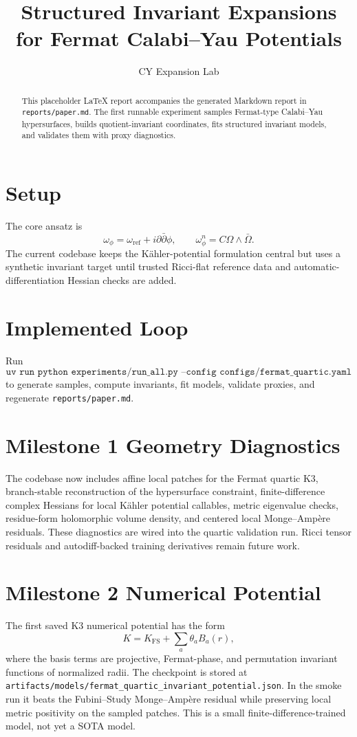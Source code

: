 \documentclass{article}
\title{Structured Invariant Expansions for Fermat Calabi--Yau Potentials}
\author{CY Expansion Lab}
\date{}
\begin{document}
\maketitle

\begin{abstract}
This placeholder \LaTeX{} report accompanies the generated Markdown report in \texttt{reports/paper.md}. The first runnable experiment samples Fermat-type Calabi--Yau hypersurfaces, builds quotient-invariant coordinates, fits structured invariant models, and validates them with proxy diagnostics.
\end{abstract}

\section{Setup}
The core ansatz is
\[
\omega_\phi = \omega_{\mathrm{ref}} + i\partial\bar\partial\phi,
\qquad \omega_\phi^n = C\Omega\wedge\bar\Omega.
\]
The current codebase keeps the Kähler-potential formulation central but uses a synthetic invariant target until trusted Ricci-flat reference data and automatic-differentiation Hessian checks are added.

\section{Implemented Loop}
Run
\[
\texttt{uv run python experiments/run\_all.py --config configs/fermat\_quartic.yaml}
\]
to generate samples, compute invariants, fit models, validate proxies, and regenerate \texttt{reports/paper.md}.

\section{Milestone 1 Geometry Diagnostics}
The codebase now includes affine local patches for the Fermat quartic K3, branch-stable reconstruction of the hypersurface constraint, finite-difference complex Hessians for local Kähler potential callables, metric eigenvalue checks, residue-form holomorphic volume density, and centered local Monge--Ampère residuals. These diagnostics are wired into the quartic validation run. Ricci tensor residuals and autodiff-backed training derivatives remain future work.

\section{Milestone 2 Numerical Potential}
The first saved K3 numerical potential has the form
\[
K = K_{\mathrm{FS}} + \sum_a \theta_a B_a(r),
\]
where the basis terms are projective, Fermat-phase, and permutation invariant functions of normalized radii. The checkpoint is stored at \texttt{artifacts/models/fermat\_quartic\_invariant\_potential.json}. In the smoke run it beats the Fubini--Study Monge--Ampère residual while preserving local metric positivity on the sampled patches. This is a small finite-difference-trained model, not yet a SOTA model.
\end{document}
